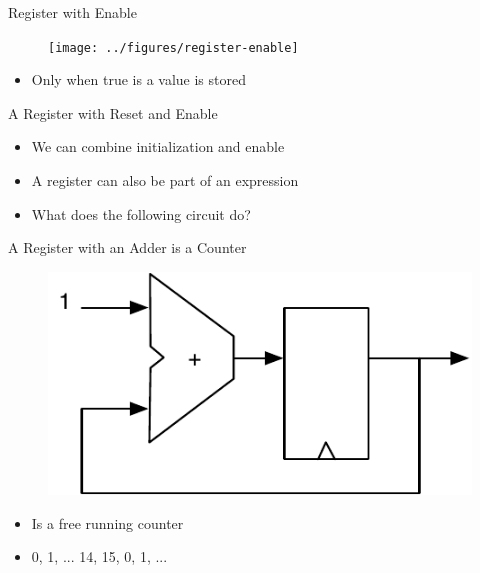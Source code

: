 \begin{frame}[fragile]{Register with Enable}
\begin{figure}
  \texttt{[image: ../figures/register-enable]}
\end{figure}
\begin{itemize}
\item Only when  true is a value is stored
\end{itemize}

\end{frame}

\begin{frame}[fragile]{A Register with Reset and Enable}
\begin{itemize}
\item We can combine initialization and enable
\end{itemize}
\begin{itemize}
\item A register can also be part of an expression
\item What does the following circuit do?
\end{itemize}
\end{frame}


\begin{frame}[fragile]{A Register with an Adder is a Counter}
\begin{figure}
  \includegraphics[scale=\scale]{../figures/counter}
\end{figure}
\begin{itemize}
\item Is a free running counter
\item 0, 1, ... 14, 15, 0, 1, ...
\end{itemize}
\end{frame}


